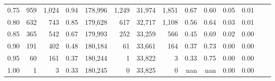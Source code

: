 \begin{tabular}{rrrrrrrrrrrrrr}
0.75 &     959 &  1,024 &    0.94 &  178,996 &    1,249 &  31,974 &   1,851 &  0.67 &  0.60 &  0.05 &      0.01 \\
0.80 &     632 &    743 &    0.85 &  179,628 &      617 &  32,717 &   1,108 &  0.56 &  0.64 &  0.03 &      0.01 \\
0.85 &     365 &    542 &    0.67 &  179,993 &      252 &  33,259 &     566 &  0.45 &  0.69 &  0.02 &      0.00 \\
0.90 &     191 &    402 &    0.48 &  180,184 &       61 &  33,661 &     164 &  0.37 &  0.73 &  0.00 &      0.00 \\
0.95 &      60 &    161 &    0.37 &  180,244 &        1 &  33,822 &       3 &  0.33 &  0.75 &  0.00 &      0.00 \\
1.00 &       1 &      3 &    0.33 &  180,245 &        0 &  33,825 &       0 &   nan &   nan &  0.00 &      0.00 \\
\bottomrule
\end{tabular}
